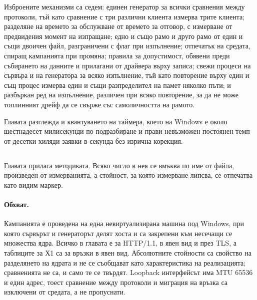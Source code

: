 Изброените механизми са седем: единен генератор за всички сравнения между протоколи, тъй като
сравнение с три различни клиента измерва трите клиента; разделяне на времето за обслужване от
времето за отговор, с измерване от предвидения момент на изпращане; едно и също рамо и друго
рамо от един и същи двоичен файл, разграничени с флаг при изпълнение; отпечатък на средата,
спиращ кампанията при промяна; правила за допустимост, обявени преди събирането на данните и
прилагани от драйвера върху записа; свежи процеси на сървъра и на генератора за всяко
изпълнение, тъй като повторение върху един и същ процес измерва един и същи разпределител на
памет няколко пъти; и разбъркан ред на изпълнение, различен при всяко повторение, за да не
може топлинният дрейф да се свърже със самоличността на рамото.

Главата разглежда и квантуването на таймера, което на Windows е около шестнадесет
милисекунди по подразбиране и прави невъзможен постоянен темп от десетки хиляди заявки в
секунда без изрична корекция.

\subsection*{}

Главата прилага методиката. Всяко число в нея се вмъква по име от файла, произведен от
измерванията, а стойност, за която измерване липсва, се отпечатва като видим маркер.

\paragraph{Обхват.} Кампанията е проведена на една невиртуализирана машина под Windows, при
която сървърът и генераторът делят хоста и са закрепени към несечащи се множества ядра.
Всичко в главата е за HTTP/1.1, в явен вид и през TLS, а таблиците за Х1 са за връзки в явен
вид. Абсолютните стойности са свойство на разделянето на
ядрата и не се съобщават като характеристика на реализацията; сравненията не са, и само те се
твърдят. Loopback интерфейсът има MTU 65536 и един адрес, тоест сравнение между протоколи и
миграция на връзка са изключени от средата, а не пропуснати.

